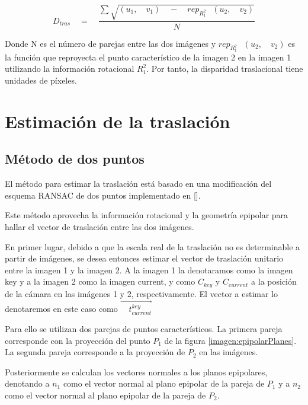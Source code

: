 \begin{equation}
{ D }_{ tras }\quad =\quad \frac { \sum { \sqrt { ({ u }_{ 1 },\quad { v }_{ 1 })\quad -\quad { rep }_{ { R }_{ 1 }^{ 2 }\quad  }({ u }_{ 2 },\quad { v }_{ 2 }) }  }  }{ N } 
\label{eq:DisparidadTraslacional}
\end{equation}

Donde N es el número de parejas entre las dos imágenes y ${ rep }_{ { R }_{ 1 }^{ 2 }\quad  }({ u }_{ 2 },\quad { v }_{ 2 })$ es la función que reproyecta el punto característico de la imagen 2 en la imagen 1 utilizando la información rotacional ${ R }_{ 1 }^{ 2}$. 
Por tanto, la disparidad traslacional tiene unidades de píxeles.



\section{Estimación de la traslación}

\subsection{Método de dos puntos}
El método para estimar la traslación está basado en una modificación del esquema RANSAC de dos puntos implementado en [].
 
Este método aprovecha la información rotacional y la geometría epipolar para hallar el vector de traslación entre las dos imágenes.

En primer lugar, debido a que la escala real de la traslación no es determinable a partir de imágenes,  se desea entonces estimar el vector de traslación unitario entre la imagen 1 y la imagen 2. A la imagen 1 la denotaramos como la imagen key y a la imagen 2 como la imagen current, y como ${C}_{key}$ y ${C}_{current}$ a la posición de la cámara en las imágenes 1 y 2, respectivamente. El vector a estimar lo denotaremos en este caso como $\overset { \rightarrow  }{ { \quad t }_{ current }^{ key } }  $

Para ello se utilizan dos parejas de puntos característicos. La primera pareja corresponde con la proyección del punto ${P}_{1}$ de la figura \ref{imagen:epipolarPlanes}. La segunda pareja corresponde a la proyección de ${P}_{2}$ en las imágenes. 

Posteriormente se  calculan los vectores normales a los planos epipolares, denotando a ${n}_{1}$ como el vector normal al plano epipolar de la pareja de ${P}_{1}$ y a ${n}_{2}$ como el vector normal al plano epipolar de la pareja de ${P}_{2}$.


